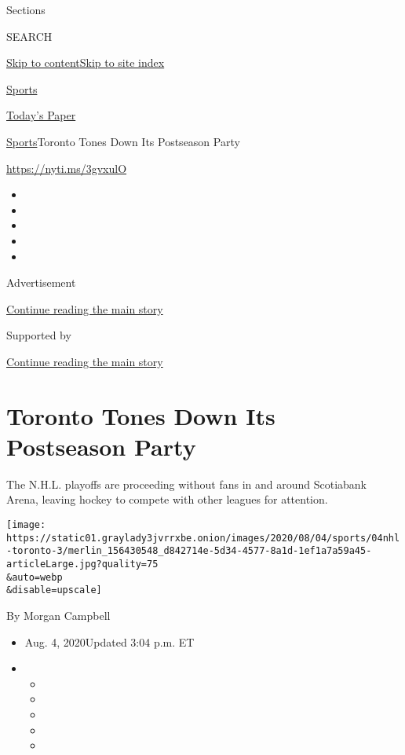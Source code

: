Sections

SEARCH

\protect\hyperlink{site-content}{Skip to
content}\protect\hyperlink{site-index}{Skip to site index}

\href{https://www.nytimes3xbfgragh.onion/section/sports}{Sports}

\href{https://myaccount.nytimes3xbfgragh.onion/auth/login?response_type=cookie\&client_id=vi}{}

\href{https://www.nytimes3xbfgragh.onion/section/todayspaper}{Today's
Paper}

\href{/section/sports}{Sports}\textbar{}Toronto Tones Down Its
Postseason Party

\url{https://nyti.ms/3gvxulO}

\begin{itemize}
\item
\item
\item
\item
\item
\end{itemize}

Advertisement

\protect\hyperlink{after-top}{Continue reading the main story}

Supported by

\protect\hyperlink{after-sponsor}{Continue reading the main story}

\hypertarget{toronto-tones-down-its-postseason-party}{%
\section{Toronto Tones Down Its Postseason
Party}\label{toronto-tones-down-its-postseason-party}}

The N.H.L. playoffs are proceeding without fans in and around Scotiabank
Arena, leaving hockey to compete with other leagues for attention.

\texttt{[image: https://static01.graylady3jvrrxbe.onion/images/2020/08/04/sports/04nhl-toronto-3/merlin\_156430548\_d842714e-5d34-4577-8a1d-1ef1a7a59a45-articleLarge.jpg?quality=75\\\&auto=webp\\\&disable=upscale]}

By Morgan Campbell

\begin{itemize}
\item
  Aug. 4, 2020Updated 3:04 p.m. ET
\item
  \begin{itemize}
  \item
  \item
  \item
  \item
  \item
  \end{itemize}
\end{itemize}

